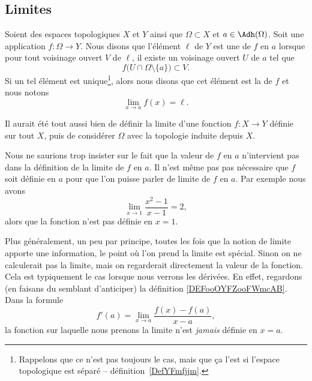 \subsection{Limites}

\begin{definition}\label{DefYNVoWBx}
    Soient des espaces topologiques \( X\) et \( Y\) ainsi que \( \Omega\subset X\) et \( a\in \Adh(\Omega)\). Soit une application \( f\colon \Omega\to Y\). Nous disons que l'élément \( \ell\) de \( Y\) est une  de \( f\) en \( a\) lorsque pour tout voisinage ouvert \( V\) de \( \ell\), il existe un voisinage ouvert \( U\) de \( a\) tel que
    \begin{equation}        \label{EQooXLJJooZDcOtU}
        f\big( U\cap\Omega\setminus\{ a \} \big)\subset V.
    \end{equation}
    Si un tel élément est unique\footnote{Rappelons que ce n'est pas toujours le cas, mais que ça l'est si l'espace topologique est séparé -- définition~\ref{DefYFmfjjm}.}, alors nous disons que cet élément est la  de \( f\) et nous notons
    \begin{equation}
        \lim_{x\to a} f(x)=\ell.
    \end{equation}
\end{definition}

\begin{normaltext}
    Il aurait été tout aussi bien de définir la limite d'une fonction \( f\colon X\to Y\) définie sur tout \( X\), puis de considérer \( \Omega\) avec la topologie induite depuis \( X\).
\end{normaltext}

\begin{remark}
    Nous ne saurions trop insister sur le fait que la valeur de \( f\) en \( a\) n'intervient pas dans la définition de la limite de \( f\) en \( a\). Il n'est même pas pas nécessaire que \( f\) soit définie en \( a\) pour que l'on puisse parler de limite de \( f\) en \( a\). Par exemple nous avons
    \begin{equation}
        \lim_{x\to 1} \frac{ x^2-1 }{ x-1 }=2,
    \end{equation}
    alors que la fonction n'est pas définie en \( x=1\).

    Plus généralement, un peu par principe, toutes les fois que la notion de limite apporte une information, le point où l'on prend la limite est spécial. Sinon on ne calculerait pas la limite, mais on regarderait directement la valeur de la fonction. Cela est typiquement le cas lorsque nous verrons les dérivées. En effet, regardons (en faisans du semblant d'anticiper) la définition  \eqref{DEFooOYFZooFWmcAB}. Dans la formule
    \begin{equation}
        f'(a)=\lim_{x\to a} \frac{ f(x)-f(a) }{ x-a },
    \end{equation}
    la fonction sur laquelle nous prenons la limite n'est \emph{jamais} définie en \( x=a\).
\end{remark}


